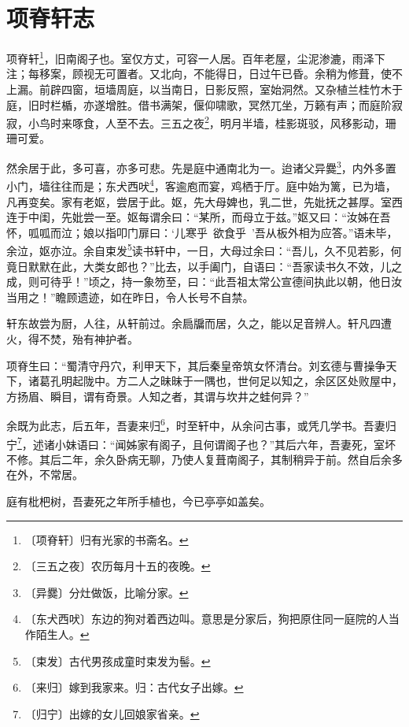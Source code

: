 \documentclass[12pt,UTF-8,openany]{ctexbook}
\begin{document}
\chapter{项脊轩志}

\begin{normalsize}
    
    项脊轩\footnote{〔项脊轩〕归有光家的书斋名。}，旧南阁子也。室仅方丈，可容一人居。百年老屋，尘泥渗漉，雨泽下注；每移案，顾视无可置者。又北向，不能得日，日过午已昏。余稍为修葺，使不上漏。前辟四窗，垣墙周庭，以当南日，日影反照，室始洞然。又杂植兰桂竹木于庭，旧时栏楯，亦遂增胜。借书满架，偃仰啸歌，冥然兀坐，万籁有声；而庭阶寂寂，小鸟时来啄食，人至不去。三五之夜\footnote{〔三五之夜〕农历每月十五的夜晚。}，明月半墙，桂影斑驳，风移影动，珊珊可爱。
    
    然余居于此，多可喜，亦多可悲。先是庭中通南北为一。迨诸父异爨\footnote{〔异爨〕分灶做饭，比喻分家。}，内外多置小门，墙往往而是；东犬西吠\footnote{〔东犬西吠〕东边的狗对着西边叫。意思是分家后，狗把原住同一庭院的人当作陌生人。}，客逾庖而宴，鸡栖于厅。庭中始为篱，已为墙，凡再变矣。家有老妪，尝居于此。妪，先大母婢也，乳二世，先妣抚之甚厚。室西连于中闺，先妣尝一至。妪每谓余曰：“某所，而母立于兹。”妪又曰：“汝姊在吾怀，呱呱而泣；娘以指叩门扉曰：‘儿寒乎~欲食乎~’吾从板外相为应答。”语未毕，余泣，妪亦泣。余自束发\footnote{〔束发〕古代男孩成童时束发为髻。}读书轩中，一日，大母过余曰：“吾儿，久不见若影，何竟日默默在此，大类女郎也？”比去，以手阖门，自语曰：“吾家读书久不效，儿之成，则可待乎！”顷之，持一象笏至，曰：“此吾祖太常公宣德间执此以朝，他日汝当用之！”瞻顾遗迹，如在昨日，令人长号不自禁。
    
    轩东故尝为厨，人往，从轩前过。余扃牖而居，久之，能以足音辨人。轩凡四遭火，得不焚，殆有神护者。
    
    项脊生曰：“蜀清守丹穴，利甲天下，其后秦皇帝筑女怀清台。刘玄德与曹操争天下，诸葛孔明起陇中。方二人之昧昧于一隅也，世何足以知之，余区区处败屋中，方扬眉、瞬目，谓有奇景。人知之者，其谓与坎井之蛙何异？”
    
    余既为此志，后五年，吾妻来归\footnote{〔来归〕嫁到我家来。归：古代女子出嫁。}，时至轩中，从余问古事，或凭几学书。吾妻归宁\footnote{〔归宁〕出嫁的女儿回娘家省亲。}，述诸小妹语曰：“闻姊家有阁子，且何谓阁子也？”其后六年，吾妻死，室坏不修。其后二年，余久卧病无聊，乃使人复葺南阁子，其制稍异于前。然自后余多在外，不常居。
    
    庭有枇杷树，吾妻死之年所手植也，今已亭亭如盖矣。
\end{normalsize}


\newpage
\end{document}
